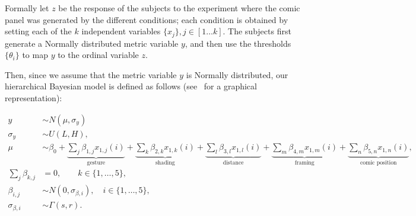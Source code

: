 Formally let $z$ be the response of the subjects to the experiment where the comic panel was generated by the different conditions; each condition is obtained by setting each of the $k$ independent variables $\{x_j\}, j \in [1 \ldots k]$. The subjects first generate a Normally distributed metric variable $y$, and then use the thresholds $\{\theta_i\}$ to map $y$ to the ordinal variable $z$.

Then, since we assume that the metric variable $y$ is Normally distributed, our hierarchical Bayesian model is defined as follows (see~ for a graphical representation):

\begin{align}
 y                  & \sim N(\mu, \sigma_y)                    \label{eq:response-main}                     \\
 \sigma_y           & \sim U(L, H), \label{eq:main-sigma}                                                   \\
 \mu                & \sim \beta_0 +
 \underbrace{\sum_{j} \beta_{1,j} x_{1,j}(i)}_{\text{gesture}} +
 \underbrace{\sum_k \beta_{2,k} x_{1,k}(i)}_{\text{shading}} +
 \underbrace{\sum_l \beta_{3,l} x_{1,l}(i)}_{\text{distance}} +
 \underbrace{\sum_m \beta_{4,m} x_{1,m}(i)}_{\text{framing}} +
 \underbrace{\sum_n \beta_{5,n} x_{1,n}(i)}_{\text{comic position}},                  \label{eq:mu-main} \\
 \sum_j \beta_{k,j} & = 0, \qquad k \in \{1, \ldots, 5\}, \label{eq:beta-equality}                          \\
 \beta_{i,j}        & \sim N(0, \sigma_{\beta, i}), \quad i \in \{1, \ldots, 5\},\label{eq:main-beta-sigma} \\
 \sigma_{\beta, i}  & \sim \Gamma(s, r ). \label{eq:gamma-distribution}
\end{align}
